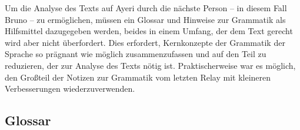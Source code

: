 \documentclass[
	12pt,
	ngerman,
]{scrartcl}
\newcommand{\zwsp}{\mbox{​}} %
\newcommand{\ayr}[1]{\zwsp\smash{{\Tagati #1}}} %
\begin{document}
Um die Analyse des Texts auf Ayeri durch die nächste Person -- in diesem Fall
Bruno -- zu ermöglichen, müssen ein Glossar und Hinweise zur Grammatik als
Hilfsmittel dazugegeben werden, beides in einem Umfang, der dem Text gerecht
wird aber nicht überfordert. Dies erfordert, Kernkonzepte der Grammatik der
Sprache so prägnant wie möglich zusammenzufassen und auf den Teil zu
reduzieren, der zur Analyse des Texts nötig ist. Praktischerweise war es
möglich, den Großteil der Notizen zur Grammatik vom letzten Relay mit kleineren
Verbesserungen wiederzuverwenden.

\subsection{Glossar}

\begin{multicols}{2}
\raggedright
\begin{description}[nosep]


\end{description}
\end{multicols}
\end{document}
